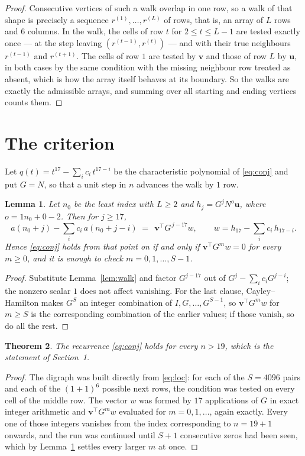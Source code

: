 \documentclass[11pt,a4paper]{article}
\theoremstyle{plain}
\newtheorem{theorem}{Theorem}
\newtheorem{lemma}[theorem]{Lemma}
\theoremstyle{definition}
\begin{document}
\begin{proof}
Consecutive vertices of such a walk overlap in one row, so a walk of that shape is
precisely a sequence $r^{(1)},\dots,r^{(L)}$ of rows, that is, an array of $L$ rows
and $6$ columns. In the walk, the cells of row $t$ for $2\le t\le L-1$ are tested
exactly once --- at the step leaving $(r^{(t-1)},r^{(t)})$ --- and with their true
neighbours $r^{(t-1)}$ and $r^{(t+1)}$. The cells of row $1$ are tested by
$\mathbf{v}$ and those of row $L$ by $\mathbf{u}$, in both cases by the same condition
with the missing neighbour row treated as absent, which is how the array itself behaves at
its boundary. So the walks are exactly the admissible arrays, and summing over all starting
and ending vertices counts them.
\end{proof}

\section{The criterion}

Let $q(t)=t^{17}-\sum_i c_i\,t^{17-i}$ be the characteristic polynomial of
\eqref{eq:conj} and put $G=N$, so that a unit step in $n$ advances the walk by
$1$ row.

\begin{lemma}\label{lem:crit}
Let $n_0$ be the least index with $L\ge2$ and $h_j=G^{j}N^{o}\mathbf{u}$, where
$o=1n_0+0-2$. Then for $j\ge17$,
\[
a(n_0+j)-\sum_i c_i\,a(n_0+j-i)\;=\;\,\mathbf{v}^{\!\top}G^{\,j-17}w,
\qquad w=h_{17}-\sum_i c_i\,h_{17-i} .
\]
Hence \eqref{eq:conj} holds from that point on if and only if
$\mathbf{v}^{\!\top}G^{m}w=0$ for every $m\ge0$, and it is enough to check
$m=0,1,\dots,S-1$.
\end{lemma}

\begin{proof}
Substitute Lemma~\ref{lem:walk} and factor $G^{j-17}$ out of
$G^{j}-\sum_ic_iG^{j-i}$; the nonzero scalar $1$ does not affect
vanishing. For the last clause, Cayley--Hamilton makes $G^{S}$ an integer combination of
$I,G,\dots,G^{S-1}$, so $\mathbf{v}^{\!\top}G^{m}w$ for $m\ge S$ is the corresponding
combination of the earlier values; if those vanish, so do all the rest.
\end{proof}

\begin{theorem}
The recurrence \eqref{eq:conj} holds for every $n>19$, which is the statement of
Section~1.
\end{theorem}

\begin{proof}
The digraph was built directly from \eqref{eq:loc}: for each of the $S=4096$ pairs and each
of the $(1+1)^{6}$ possible next rows, the condition was tested on every cell of
the middle row. The vector $w$ was formed by $17$ applications of $G$ in exact integer
arithmetic and $\mathbf{v}^{\!\top}G^{m}w$ evaluated for $m=0,1,\dots$, again exactly.
Every one of those integers vanishes from the index corresponding to $n=19+1$ onwards,
and the run was continued until $S+1$ consecutive zeros had been seen, which by
Lemma~\ref{lem:crit} settles every larger $m$ at once.
\end{proof}
\end{document}

